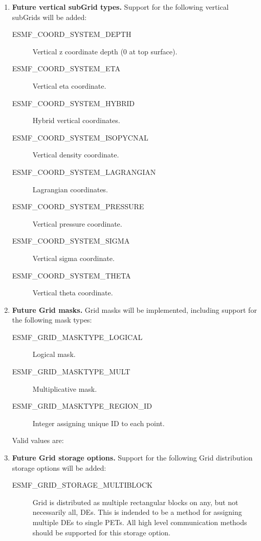 \begin{enumerate}
\item {\bf Future vertical subGrid types.}  Support for the following
vertical subGrids will be added:
 \begin{description}
    \item [ESMF\_COORD\_SYSTEM\_DEPTH]
          Vertical z coordinate depth (0 at top surface).
    \item [ESMF\_COORD\_SYSTEM\_ETA]
          Vertical eta coordinate.
    \item [ESMF\_COORD\_SYSTEM\_HYBRID]
          Hybrid vertical coordinates.
    \item [ESMF\_COORD\_SYSTEM\_ISOPYCNAL]
          Vertical density coordinate.
    \item [ESMF\_COORD\_SYSTEM\_LAGRANGIAN]
          Lagrangian coordinates.
    \item [ESMF\_COORD\_SYSTEM\_PRESSURE]
          Vertical pressure coordinate.
    \item [ESMF\_COORD\_SYSTEM\_SIGMA]
          Vertical sigma coordinate.
    \item [ESMF\_COORD\_SYSTEM\_THETA]
          Vertical theta coordinate.
 \end{description}

\item {\bf Future Grid masks.}  Grid masks will be implemented, including
support for the following mask types:
 \begin{description}
    \item [ESMF\_GRID\_MASKTYPE\_LOGICAL]
          Logical mask.
    \item [ESMF\_GRID\_MASKTYPE\_MULT]
          Multiplicative mask.
    \item [ESMF\_GRID\_MASKTYPE\_REGION\_ID]
          Integer assigning unique ID to each point.
 \end{description}

    
 Valid values are:
\item {\bf Future Grid storage options.}  Support for the following Grid
distribution storage options will be added:
 \begin{description}
    \item [ESMF\_GRID\_STORAGE\_MULTIBLOCK]
          Grid is distributed as multiple rectangular blocks on any, but not
          necessarily all, DEs.  This is indended to be a method for assigning
          multiple DEs to single PETs.  All high level communication methods
          should be supported for this storage option.
 \end{description}

\end{enumerate}


